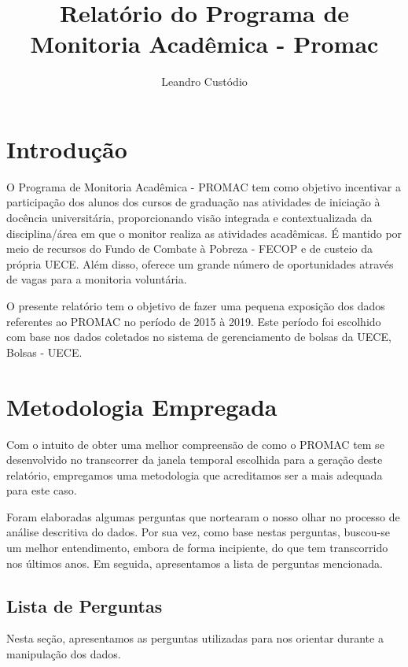 \documentclass[12pt,a4paper]{article}
\author{Leandro Custódio}
\title{Relatório do Programa de Monitoria Acadêmica - Promac}
\begin{document}
	\maketitle
	
	\pagebreak
	
    \tableofcontents \newpage

    \listoffigures \newpage

    \listoftables \newpage

    \section{Introdução}
    
    	\onehalfspacing
    	O Programa de Monitoria Acadêmica - PROMAC tem como objetivo incentivar a participação dos alunos dos cursos de 				graduação nas atividades de iniciação à docência universitária, proporcionando visão integrada e contextualizada da 			disciplina/área em que o monitor realiza as atividades acadêmicas. É mantido por meio de recursos do Fundo de Combate 		à Pobreza - FECOP e de custeio da própria UECE. Além disso, oferece um grande número de oportunidades através de 				vagas para a monitoria voluntária.

    	O presente relatório tem o objetivo de fazer uma pequena exposição dos dados referentes ao PROMAC no período de 2015 			à 2019. Este período foi escolhido com base nos dados coletados no sistema de gerenciamento de bolsas da UECE, Bolsas 		- UECE.
    	
    \section{Metodologia Empregada}
    
    	Com o intuito de obter uma melhor compreensão de como o PROMAC tem se desenvolvido no transcorrer da janela temporal 			escolhida para a geração deste relatório, empregamos uma metodologia que acreditamos ser a mais adequada para este 				caso.

    	Foram elaboradas algumas perguntas que nortearam o nosso olhar no processo de análise descritiva do dados. Por sua 				vez, como base nestas perguntas, buscou-se um melhor entendimento, embora de forma incipiente, do que tem 						transcorrido nos últimos anos. Em seguida, apresentamos a lista de perguntas mencionada.
    	
    	\subsection{Lista de Perguntas}
        Nesta seção, apresentamos as perguntas utilizadas para nos orientar durante a manipulação dos dados.
\end{document}
